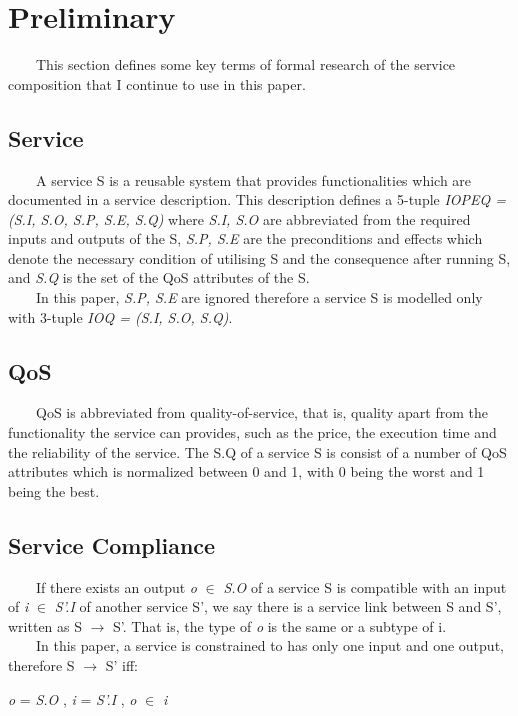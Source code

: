 \documentclass[senior,final,11pt]{iscs-thesis}
\begin{document}
\chapter{Preliminary}%
~~~~This section defines some key terms of formal research of the service composition that I continue to use in this paper.
\section{Service}
~~~~A service S is a reusable system that provides functionalities which are documented in a service description. This description defines a 5-tuple {\em IOPEQ = (S.I, S.O, S.P, S.E, S.Q)} where {\em S.I, S.O} are abbreviated from the required inputs and outputs of the S, {\em S.P, S.E} are the preconditions and effects which denote the necessary condition of utilising S and the consequence after running S, and {\em S.Q} is the set of the QoS attributes of the S. \\
~~~~In this paper, {\em S.P, S.E} are ignored therefore a service S is modelled only with 3-tuple {\em IOQ = (S.I, S.O, S.Q)}.
\section{QoS}
~~~~QoS is abbreviated from quality-of-service, that is, quality apart from the functionality the service can provides, such as the price, the execution time and the reliability of the service.
The S.Q of a service S is consist of a number of QoS attributes which is normalized between 0 and 1, with 0 being the worst and 1 being the best.

\section{Service Compliance}
~~~~If there exists an output {\em o} $\in$ {\em S.O} of a service S is compatible with an input of {\em i}  $\in$ {\em S'.I} of another service S', we say there is a service link between S and S', written as S $\to$ S'. That is, the type of {\em o} is the same or a subtype of i. \\
~~~~In this paper, a service is constrained to has only one input and one output, therefore S $\to$ S' iff:
\begin{center}
{\em o} = {\em S.O} ,  {\em i} = {\em S'.I} ,  {\em o} $\in$ {\em i}
\end{center}
\end{document}
